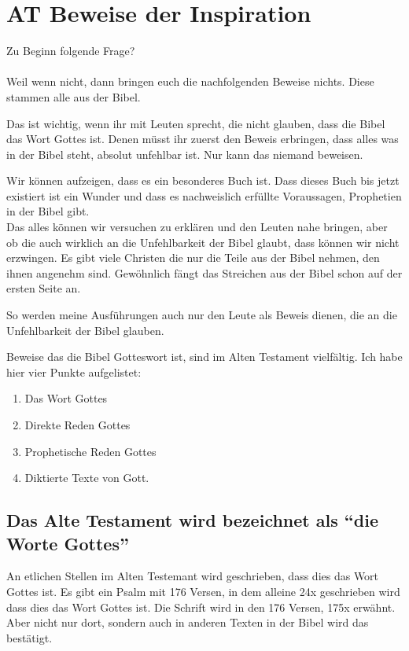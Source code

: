 \section{AT Beweise der Inspiration}

Zu Beginn folgende Frage?\\
 \\
Weil wenn nicht, dann bringen euch die nachfolgenden Beweise nichts. Diese stammen alle aus der Bibel.

Das ist wichtig, wenn ihr mit Leuten sprecht, die nicht glauben, dass die Bibel das Wort Gottes ist. Denen müsst ihr zuerst den Beweis erbringen, dass alles was in der Bibel steht, absolut unfehlbar ist. Nur kann das niemand beweisen. 

Wir können aufzeigen, dass es ein besonderes Buch ist. Dass dieses Buch bis jetzt existiert ist ein Wunder und dass es nachweislich erfüllte Voraussagen, Prophetien in der Bibel gibt.\\
Das alles können wir versuchen zu erklären und den Leuten nahe bringen, aber ob die auch wirklich an die Unfehlbarkeit der Bibel glaubt, dass können wir nicht erzwingen. Es gibt viele Christen die nur die Teile aus der Bibel nehmen, den ihnen angenehm sind. Gewöhnlich fängt das Streichen aus der Bibel schon auf der ersten Seite an.

So werden meine Ausführungen auch nur den Leute als Beweis dienen, die an die Unfehlbarkeit der Bibel glauben.

Beweise das die Bibel Gotteswort ist, sind im Alten Testament vielfältig. Ich habe hier vier Punkte aufgelistet:
\begin{enumerate}
  \item Das Wort Gottes
  \item Direkte Reden Gottes
  \item Prophetische Reden Gottes
  \item Diktierte Texte von Gott.
\end{enumerate}

\subsection{Das Alte Testament wird bezeichnet als \enquote{die Worte Gottes}}
An etlichen Stellen im Alten Testemant wird geschrieben, dass dies das Wort Gottes ist. Es gibt ein Psalm mit 176 Versen, in dem alleine 24x geschrieben wird dass dies das Wort Gottes ist. Die Schrift wird in den 176 Versen, 175x erwähnt. Aber nicht nur dort, sondern auch in anderen Texten in der Bibel wird das bestätigt.

